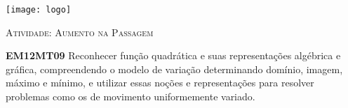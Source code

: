 \documentclass[10 pt,usenames,dvipsnames, oneside]{article}
\begin{document}
\begin{center}
  \begin{minipage}[l]{3cm}
\texttt{[image: logo]}    
\end{minipage}\hfill
\begin{minipage}[r]{.8\textwidth}
 {\Large \scshape Atividade: Aumento na Passagem}  
\end{minipage}
\end{center}
\vspace{.2cm}

\ifdefined\prof
\begin{objetivos}
\item \textbf{EM12MT09} Reconhecer função quadrática e suas representações algébrica e gráfica, compreendendo o
modelo de variação determinando domínio, imagem, máximo e mínimo, e utilizar essas noções e
representações para resolver problemas como os de movimento uniformemente variado.
\end{objetivos}
\end{document}
